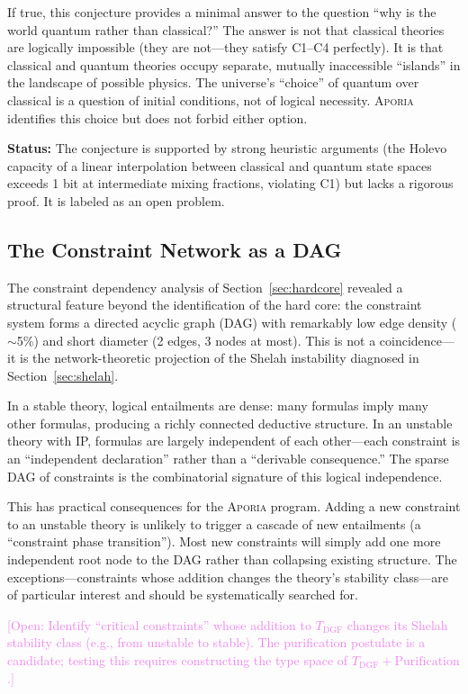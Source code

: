 \documentclass[12pt,a4paper]{article}
\theoremstyle{definition}
\theoremstyle{remark}
\newcommand{\Aporia}{\textsc{Aporia}}
\newcommand{\openproblem}[1]{\textcolor{violet}{\small [Open: #1]}}
\begin{document}
If true, this conjecture provides a minimal answer to the question ``why is the world quantum rather than classical?'' The answer is not that classical theories are logically impossible (they are not---they satisfy C1--C4 perfectly). It is that classical and quantum theories occupy separate, mutually inaccessible ``islands'' in the landscape of possible physics. The universe's ``choice'' of quantum over classical is a question of initial conditions, not of logical necessity. \Aporia{} identifies this choice but does not forbid either option.

\textbf{Status:} The conjecture is supported by strong heuristic arguments (the Holevo capacity of a linear interpolation between classical and quantum state spaces exceeds 1 bit at intermediate mixing fractions, violating C1) but lacks a rigorous proof. It is labeled as an open problem.

\subsection{The Constraint Network as a DAG}

The constraint dependency analysis of Section~\ref{sec:hardcore} revealed a structural feature beyond the identification of the hard core: the constraint system forms a directed acyclic graph (DAG) with remarkably low edge density ($\sim$5\%) and short diameter (2 edges, 3 nodes at most). This is not a coincidence---it is the network-theoretic projection of the Shelah instability diagnosed in Section~\ref{sec:shelah}.

In a stable theory, logical entailments are dense: many formulas imply many other formulas, producing a richly connected deductive structure. In an unstable theory with IP, formulas are largely independent of each other---each constraint is an ``independent declaration'' rather than a ``derivable consequence.'' The sparse DAG of constraints is the combinatorial signature of this logical independence.

This has practical consequences for the \Aporia{} program. Adding a new constraint to an unstable theory is unlikely to trigger a cascade of new entailments (a ``constraint phase transition''). Most new constraints will simply add one more independent root node to the DAG rather than collapsing existing structure. The exceptions---constraints whose addition changes the theory's stability class---are of particular interest and should be systematically searched for.

\openproblem{Identify ``critical constraints'' whose addition to $T_{\mathrm{DGF}}$ changes its Shelah stability class (e.g., from unstable to stable). The purification postulate is a candidate; testing this requires constructing the type space of $T_{\mathrm{DGF}} + \mathrm{Purification}$.}
\end{document}
